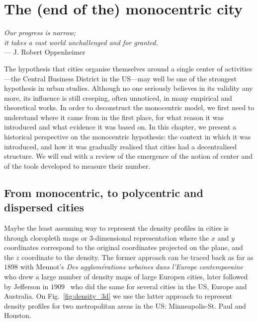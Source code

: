 %
\chapter{The (end of the) monocentric city}
\label{chap:monocentric_introduction}


\begin{flushright}{\slshape    
Our progress is narrow;\\
it takes a vast world unchallenged and for granted.}  \\ \medskip
--- J. Robert Oppenheimer~\cite{Oppenheimer:1954}
\end{flushright}

The hypothesis that cities organise themselves around a single center of
activities---the Central Business District in the US---may well be one of the
strongest hypothesis in urban studies. Although no one seriously believes in its
validity any more, its influence is still creeping, often unnoticed, in many
empirical and theoretical works.  In order to deconstruct the monocentric model,
we first need to understand where it came from in the first place, for what
reason it was introduced and what evidence it was based on. In this chapter, we
present a historical perspective on the monocentric hypothesis: the context in
which it was introduced, and how it was gradually realised that cities had a
decentralised structure. We will end with a review of the emergence of the
notion of center and of the tools developed to measure their number.

\section{From monocentric, to polycentric and dispersed cities}
\label{sec:introduction}

Maybe the least assuming way to represent the density profiles in cities is
through cloropleth maps or 3-dimensional representation where the $x$ and $y$
coordinates correspond to the original coordinates projected on the plane, and
the $z$ coordinate to the density. The former approach can be traced back as far
as $1898$ with Meunot's \emph{Des agglom\'erations urbaines dans l'Europe
contemporaine}~\cite{Meunot:1898} who drew a large number of density maps of
large Europen cities, later followed by Jefferson in
$1909$~\cite{Jefferson:1909} who did the same for several cities in the US,
Europe and Australia. On Fig.~\ref{fig:density_3d} we use the latter approach to
represent density profiles for two metropolitan areas in the US: Minneapolis-St.
Paul and Houston. \\


